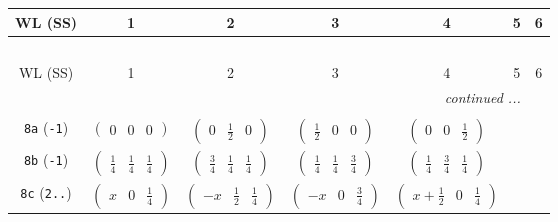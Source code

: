 \documentclass[fleqn,9pt,landscape]{jsarticle}
\begin{document}
\begin{center}
\renewcommand{\arraystretch}{1.2}
\begin{longtable}{ccccccc}
 \hline \hline
WL (SS) & 1 & 2 & 3 & 4 & 5 & 6 \\ \hline \endfirsthead

\multicolumn{6}{l}{\tablename\ \thetable{}} \\
 \hline \hline
WL (SS) & 1 & 2 & 3 & 4 & 5 & 6 \\ \hline \endhead

 \hline \hline
\multicolumn{6}{r}{\footnotesize\it continued ...} \\ \endfoot

 \hline \hline
\multicolumn{6}{r}{} \\ \endlastfoot

{\tt 8a} ({\tt -1}) & $ \begin{pmatrix} 0 & 0 & 0 \end{pmatrix} $ & $ \begin{pmatrix} 0 & \frac{1}{2} & 0 \end{pmatrix} $ & $ \begin{pmatrix} \frac{1}{2} & 0 & 0 \end{pmatrix} $ & $ \begin{pmatrix} 0 & 0 & \frac{1}{2} \end{pmatrix} $ & $  $ & $  $ \\ \hline
{\tt 8b} ({\tt -1}) & $ \begin{pmatrix} \frac{1}{4} & \frac{1}{4} & \frac{1}{4} \end{pmatrix} $ & $ \begin{pmatrix} \frac{3}{4} & \frac{1}{4} & \frac{1}{4} \end{pmatrix} $ & $ \begin{pmatrix} \frac{1}{4} & \frac{1}{4} & \frac{3}{4} \end{pmatrix} $ & $ \begin{pmatrix} \frac{1}{4} & \frac{3}{4} & \frac{1}{4} \end{pmatrix} $ & $  $ & $  $ \\ \hline
{\tt 8c} ({\tt 2..}) & $ \begin{pmatrix} x & 0 & \frac{1}{4} \end{pmatrix} $ & $ \begin{pmatrix} - x & \frac{1}{2} & \frac{1}{4} \end{pmatrix} $ & $ \begin{pmatrix} - x & 0 & \frac{3}{4} \end{pmatrix} $ & $ \begin{pmatrix} x + \frac{1}{2} & 0 & \frac{1}{4} \end{pmatrix} $ & $  $ & $  $ \\ \hline

\end{longtable}
\end{center}
\end{document}
